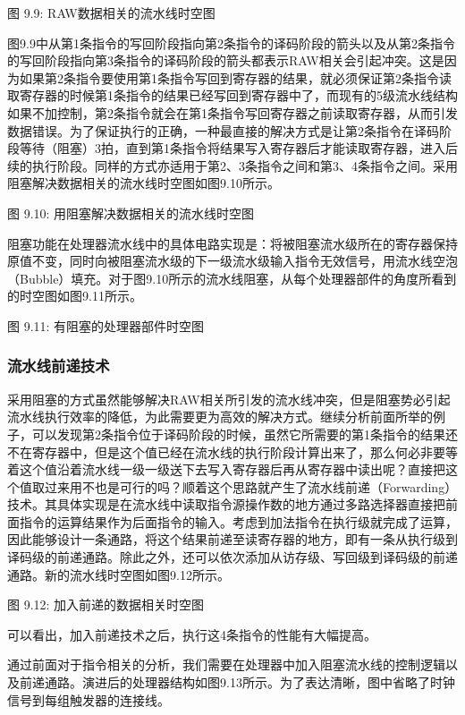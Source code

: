 \documentclass[]{ctexbook}
\begin{document}
图 9.9: RAW数据相关的流水线时空图

图9.9中从第1条指令的写回阶段指向第2条指令的译码阶段的箭头以及从第2条指令的写回阶段指向第3条指令的译码阶段的箭头都表示RAW相关会引起冲突。这是因为如果第2条指令要使用第1条指令写回到寄存器的结果，就必须保证第2条指令读取寄存器的时候第1条指令的结果已经写回到寄存器中了，而现有的5级流水线结构如果不加控制，第2条指令就会在第1条指令写回寄存器之前读取寄存器，从而引发数据错误。为了保证执行的正确，一种最直接的解决方式是让第2条指令在译码阶段等待（阻塞）3拍，直到第1条指令将结果写入寄存器后才能读取寄存器，进入后续的执行阶段。同样的方式亦适用于第2、3条指令之间和第3、4条指令之间。采用阻塞解决数据相关的流水线时空图如图9.10所示。

图 9.10: 用阻塞解决数据相关的流水线时空图

阻塞功能在处理器流水线中的具体电路实现是：将被阻塞流水级所在的寄存器保持原值不变，同时向被阻塞流水级的下一级流水级输入指令无效信号，用流水线空泡（Bubble）填充。对于图9.10所示的流水线阻塞，从每个处理器部件的角度所看到的时空图如图9.11所示。

图 9.11: 有阻塞的处理器部件时空图

\hypertarget{ux6d41ux6c34ux7ebfux524dux9012ux6280ux672f}{%
\subsubsection{流水线前递技术}\label{ux6d41ux6c34ux7ebfux524dux9012ux6280ux672f}}

采用阻塞的方式虽然能够解决RAW相关所引发的流水线冲突，但是阻塞势必引起流水线执行效率的降低，为此需要更为高效的解决方式。继续分析前面所举的例子，可以发现第2条指令位于译码阶段的时候，虽然它所需要的第1条指令的结果还不在寄存器中，但是这个值已经在流水线的执行阶段计算出来了，那么何必非要等着这个值沿着流水线一级一级送下去写入寄存器后再从寄存器中读出呢？直接把这个值取过来用不也是可行的吗？顺着这个思路就产生了流水线前递（Forwarding）技术。其具体实现是在流水线中读取指令源操作数的地方通过多路选择器直接把前面指令的运算结果作为后面指令的输入。考虑到加法指令在执行级就完成了运算，因此能够设计一条通路，将这个结果前递至读寄存器的地方，即有一条从执行级到译码级的前递通路。除此之外，还可以依次添加从访存级、写回级到译码级的前递通路。新的流水线时空图如图9.12所示。

图 9.12: 加入前递的数据相关时空图

可以看出，加入前递技术之后，执行这4条指令的性能有大幅提高。

通过前面对于指令相关的分析，我们需要在处理器中加入阻塞流水线的控制逻辑以及前递通路。演进后的处理器结构如图9.13所示。为了表达清晰，图中省略了时钟信号到每组触发器的连接线。
\end{document}
